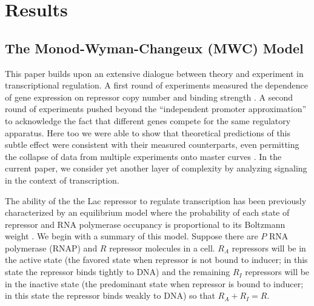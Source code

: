 \pagebreak
\section*{Results}

\subsection*{The Monod-Wyman-Changeux (MWC) Model }



This paper builds upon an extensive dialogue between theory and experiment in
transcriptional regulation. A first round of experiments measured the dependence
of gene expression on repressor copy number and binding strength
\cite{Garcia2011}. A second round of experiments pushed beyond the ``independent
promoter approximation'' to acknowledge the fact that different genes compete
for the same regulatory apparatus.  Here too we were able to show that
theoretical predictions of this subtle effect were consistent with their
measured counterparts, even permitting the collapse of data from multiple
experiments onto master curves \cite{Brewster2014, Weinert2014}. In the current
paper, we consider yet another layer of complexity by analyzing signaling in the
context of transcription.

The ability of the the Lac repressor to regulate transcription has been
previously characterized by an equilibrium model where the probability of each
state of repressor and RNA polymerase occupancy is proportional to its Boltzmann
weight \cite{Daber2011a, Phillips2015a}. We begin with a summary of this model.
Suppose there are \(P\) RNA polymerase (RNAP) and \(R\) repressor molecules in a
cell. \(R_A\) repressors will be in the active state (the favored state when
repressor is not bound to inducer; in this state the repressor binds tightly to
DNA) and the remaining \(R_I\) repressors will be in the inactive state (the
predominant state when repressor is bound to inducer; in this state the
repressor binds weakly to DNA) so that \(R_A+R_I=R\). 

